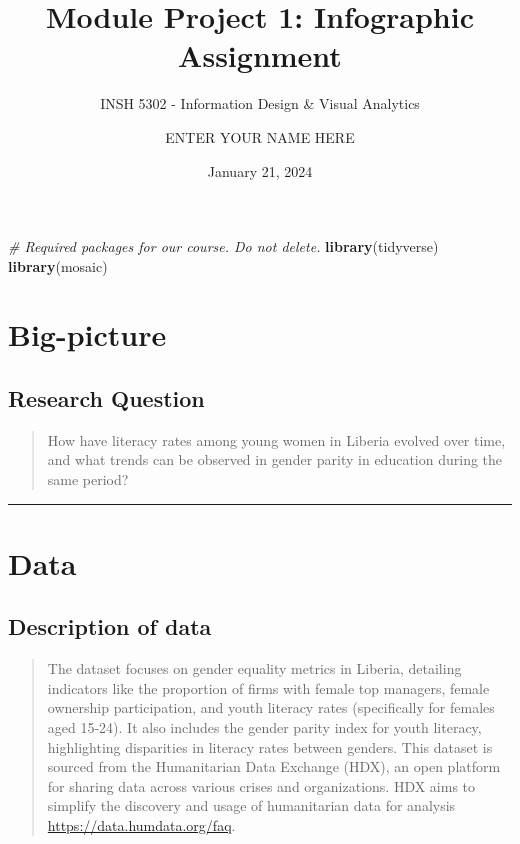 \documentclass[
]{article}
\title{Module Project 1: Infographic Assignment}
\subtitle{INSH 5302 - Information Design \& Visual Analytics}
\author{ENTER YOUR NAME HERE}
\date{January 21, 2024}
\newenvironment{Shaded}{\begin{snugshade}}{\end{snugshade}}
\newcommand{\CommentTok}[1]{\textcolor[rgb]{0.56,0.35,0.01}{\textit{#1}}}
\newcommand{\FunctionTok}[1]{\textcolor[rgb]{0.13,0.29,0.53}{\textbf{#1}}}
\newcommand{\NormalTok}[1]{#1}
\begin{document}
\maketitle

{
\setcounter{tocdepth}{2}
\tableofcontents
}
\begin{Shaded}
\begin{Highlighting}[]
\CommentTok{\# Required packages for our course. Do not delete.}
\FunctionTok{library}\NormalTok{(tidyverse)}
\FunctionTok{library}\NormalTok{(mosaic)}
\end{Highlighting}
\end{Shaded}

\section{Big-picture}\label{big-picture}

\subsection{Research Question}\label{research-question}

\begin{quote}
How have literacy rates among young women in Liberia evolved over time,
and what trends can be observed in gender parity in education during the
same period?
\end{quote}

\begin{center}\rule{0.5\linewidth}{0.5pt}\end{center}

\section{Data}\label{data}

\subsection{Description of data}\label{description-of-data}

\begin{quote}
The dataset focuses on gender equality metrics in Liberia, detailing
indicators like the proportion of firms with female top managers, female
ownership participation, and youth literacy rates (specifically for
females aged 15-24). It also includes the gender parity index for youth
literacy, highlighting disparities in literacy rates between genders.
This dataset is sourced from the Humanitarian Data Exchange (HDX), an
open platform for sharing data across various crises and organizations.
HDX aims to simplify the discovery and usage of humanitarian data for
analysis \url{https://data.humdata.org/faq}.
\end{quote}
\end{document}
